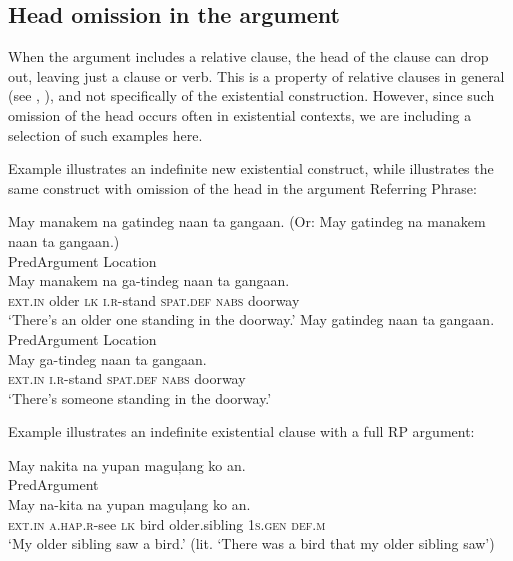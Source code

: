 \subsection{Head omission in the argument}
\label{sec:headomision}

When the argument includes a relative clause, the head of the clause can drop out, leaving just a clause or verb. This is a property of relative clauses in general (see , ), and not specifically of the existential construction. However, since such omission of the head occurs often in existential contexts, we are including a selection of such examples here.

Example  illustrates an indefinite new existential construct, while  illustrates the same construct with omission of the head in the argument Referring Phrase:
 
\ea
\label{ex:indefinitenewconstruct}
May  manakem  na  gatindeg  naan  ta  gangaan. (Or: May  gatindeg  na  manakem  naan  ta  gangaan.) \\\smallskip
Pred\hspace{13pt}Argument\hspace{58pt}  Location \\
\gll May  manakem  na  ga-tindeg  naan  ta  gangaan. \\
\textsc{ext.in}  older \textsc{lk} \textsc{i.r}-stand  \textsc{spat.def}  \textsc{nabs}  doorway \\
\glt ‘There’s an older one standing in the doorway.’
\z
\ea
\label{ex:indefinitenewconstructwithheadomission}
May  gatindeg  naan  ta  gangaan. \\\smallskip
Pred\hspace{13pt}Argument  Location \\
\gll May  ga-tindeg  naan  ta  gangaan. \\
\textsc{ext.in}  \textsc{i.r}-stand  \textsc{spat.def}  \textsc{nabs}  doorway \\
\glt ‘There’s someone standing in the doorway.’
\z

Example  illustrates an indefinite existential clause with a full RP argument:

\ea
\label{ex:indefiniteexistentialclausewithafullrpargument}
May  nakita  na  yupan  maguļang  ko  an. \\\smallskip
Pred\hspace{13pt}Argument  \\
\gll May  na-kita  na  yupan  maguļang  ko  an. \\
\textsc{ext.in}  \textsc{a.hap.r}-see  \textsc{lk}  bird  older.sibling  1\textsc{s.gen}  \textsc{def.m} \\
\glt `My older sibling saw a bird.’ (lit. `There was a bird that my older sibling saw')
\z

